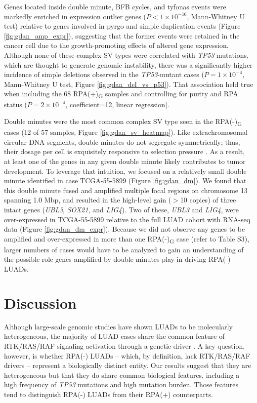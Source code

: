 \documentclass[phd,tocprelim]{cornell}
\begin{document}
Genes located inside double minute, BFB cycles, and tyfonas events were markedly enriched in expression outlier genes ($P < 1 \times 10^{-16}$, Mann-Whitney U test) relative to genes involved in pyrgo and simple duplication events (Figure \ref{fig:gdan_amp_expr}), suggesting that the former events were retained in the cancer cell due to the growth-promoting effects of altered gene expression. Although none of these complex SV types were correlated with \textit{TP53} mutations, which are thought to generate genomic instability, there was a significantly higher incidence of simple deletions observed in the \textit{TP53}-mutant cases ($P=1 \times 10^{-4}$, Mann-Whitney U test, Figure \ref{fig:gdan_del_vs_p53}). That association held true when including the 68 RPA(+)\textsubscript{G} samples and controlling for purity and RPA status ($P=2 \times 10^{-4}$, coefficient=12, linear regression).

Double minutes were the most common complex SV type seen in the RPA(-)\textsubscript{G} cases (12 of 57 samples, Figure \ref{fig:gdan_sv_heatmap}). Like extrachromosomal circular DNA segments, double minutes do not segregate symmetrically; thus, their dosage per cell is exquisitely responsive to selection pressure \cite{Verhaak2019,Wu2019-ap}. As a result, at least one of the genes in any given double minute likely contributes to tumor development. To leverage that intuition, we focused on a relatively small double minute identified in case TCGA-55-5899 (Figure \ref{fig:gdan_dm}). We found that this double minute fused and amplified multiple focal regions on chromosome 13 spanning 1.0 Mbp, and resulted in the high-level gain ($>$10 copies) of three intact genes (\textit{UBL3}, \textit{SOX21}, and \textit{LIG4}). Two of these, \textit{UBL3} and \textit{LIG4}, were over-expressed in TCGA-55-5899 relative to the full LUAD cohort with RNA-seq data (Figure \ref{fig:gdan_dm_expr}). Because we did not observe any genes to be amplified and over-expressed in more than one RPA(-)\textsubscript{G} case (refer to \cite{Carrot-Zhang2020-vl} Table S3), larger numbers of cases would have to be analyzed to gain an understanding of the possible role genes amplified by double minutes play in driving RPA(-) LUADs.

\section{Discussion}
Although large-scale genomic studies have shown LUADs to be molecularly heterogeneous, the majority of LUAD cases share the common feature of RTK/RAS/RAF signaling activation through a genetic driver \cite{Desai2014-qe,Swanton2016-lg}. A key question, however, is whether RPA(-) LUADs – which, by definition, lack RTK/RAS/RAF drivers – represent a biologically distinct entity. Our results suggest that they are heterogeneous but that they do share common biological features, including a high frequency of \textit{TP53} mutations and high mutation burden. Those features tend to distinguish RPA(-) LUADs from their RPA(+) counterparts.
\end{document}
